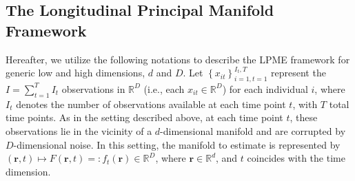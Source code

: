 \documentclass[11pt,reqno]{article}
\theoremstyle{definition}
\begin{document}

\subsection{The Longitudinal Principal Manifold Framework}\label{section: The Longitudinal Principal Manifold Framework}

Hereafter, we utilize the following notations to describe the LPME framework for generic low and high dimensions, $d$ and $D$. Let $\left\{x_{it}\right\}_{i=1, t=1}^{I_t, T}$ represent the $I = \sum_{t=1}^{T}I_t$ observations in $\mathbb{R}^D$ (i.e., each $x_{it}\in\mathbb{R}^D$) for each individual $i$, where $I_t$ denotes the number of observations available at each time point $t$, with $T$ total time points. As in the setting described above, at each time point $t$, these observations lie in the vicinity of a $d$-dimensional manifold and are corrupted by $D$-dimensional noise. In this setting, the manifold to estimate is represented by $(\mathbf{r},t)\mapsto F(\mathbf{r},t)=:f_t(\mathbf{r})\in\mathbb{R}^D$, where $\mathbf{r}\in\mathbb{R}^d$, and $t$ coincides with the time dimension.
\end{document}
